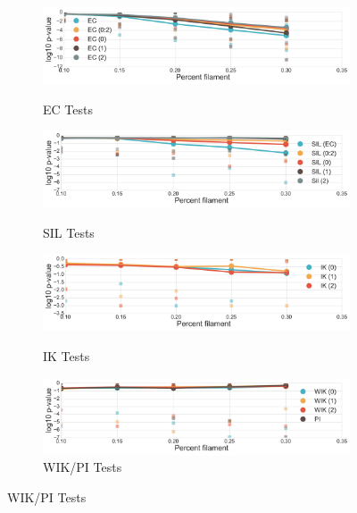\documentclass[12pt]{article}
\begin{document}
\begin{center}
  \begin{figure}[htp!]
    \centering
    \begin{subfigure}{.5\textwidth}
      \centering
      \caption{EC Tests}
      \includegraphics[width=\linewidth]{figure_8_euler_group.pdf}
      \label{fig:sub_euler}
    \end{subfigure}
    \begin{subfigure}{.5\textwidth}
      \centering
      \caption{SIL Tests}
      \includegraphics[width=\linewidth]{figure_8_silhouette_group.pdf}
      \label{fig:sub_silh}
    \end{subfigure}
    \begin{subfigure}{.5\textwidth}
      \centering
      \caption{IK Tests}
      \includegraphics[width=\linewidth]{figure_8_contour_group.pdf}
      \label{fig:sub_contour}
    \end{subfigure}
    \begin{subfigure}{.5\textwidth}
      \centering
      \caption{WIK/PI Tests}
      \includegraphics[width=\linewidth]{figure_8_weighted_contour_group.pdf}

\end{subfigure}
\end{figure}
\end{center}
\end{document}
